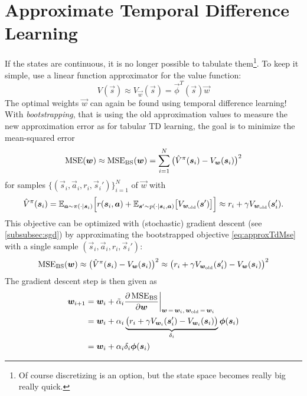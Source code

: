 	\section{Approximate Temporal Difference Learning}
		If the states are continuous, it is no longer possible to tabulate them\footnote{Of course discretizing is an option, but the state space becomes really big really quick.}. To keep it simple, use a linear function approximator for the value function:
		\begin{equation*}
			V(\vec{s}) \approx V_{\vec{w}}(\vec{s}) = \vec{\phi}^T(\vec{s}) \vec{w}
		\end{equation*}
		The optimal weights \(\vec{w}\) can again be found using temporal difference learning! With \emph{bootstrapping}, that is using the old approximation values to measure the new approximation error as for tabular TD learning, the goal is to minimize the mean-squared error
		\begin{equation*}
			\operatorname{MSE}(\bm{w}) \approx \operatorname{MSE}_\mathrm{BS}(\bm{w}) = \sum_{i = 1}^{N} \big( \hat{V}^\pi(\bm{s}_i) - V_{\bm{w}}(\bm{s}_i) \big)^2  \label{eq:approxTdMse}
		\end{equation*}
		for samples \( \big\{ (\vec{s}_i, \vec{a}_i, r_i, \vec{s}_i') \big\}_{i = 1}^{N} \) of \(\vec{w}\) with
		\begin{equation*}
			\hat{V}^\pi(\bm{s}_i) = \mathbb{E}_{\bm{a} \sim \pi(\cdot \vert \bm{s}_i)} \Big[ r(\bm{s}_i, \bm{a}) + \mathbb{E}_{\bm{s}' \sim p(\cdot \vert \bm{s}_i, \bm{a})}\big[ V_{\bm{w}_\mathrm{old}}(\bm{s}') \big] \Big] \approx r_i + \gamma V_{\bm{w}_\mathrm{old}}(\bm{s}_i').
		\end{equation*}
		This objective can be optimized with (stochastic) gradient descent (see \autoref{subsubsec:sgd}) by approximating the bootstrapped objective \eqref{eq:approxTdMse} with a single sample \( (\vec{s}_i, \vec{a}_i, r_i, \vec{s}_i') \):
		\begin{equation}
			\operatorname{MSE}_\mathrm{BS}(\bm{w})
				\approx \big( \hat{V}^\pi(\bm{s}_i) - V_{\bm{w}}(\bm{s}_i) \big)^2
				\approx \big( r_i + \gamma V_{\bm{w}_\mathrm{old}}(\bm{s}_i') - V_{\bm{w}}(\bm{s}_i) \big)^2  \label{eq:approxValueError}
		\end{equation}
		The gradient descent step is then given as
		\begin{align*}
			\bm{w}_{i + 1}
				&= \bm{w}_i + \tilde{\alpha}_i \pdv{\operatorname{MSE}_\mathrm{BS}}{\bm{w}} \bigg\vert_{\bm{w} \,=\, \bm{w}_i,\, \bm{w}_\mathrm{old} \,=\, \bm{w}_i} \\
				&= \bm{w}_i + \alpha_i \underbrace{\big( r_i + \gamma V_{\bm{w}_i}(\bm{s}_i') - V_{\bm{w}_i}(\bm{s}_i) \big)}_{\delta_i} \bm{\phi}(\bm{s}_i) \\
				&= \bm{w}_i + \alpha_i \delta_i \bm{\phi}(\bm{s}_i)
		\end{align*}
